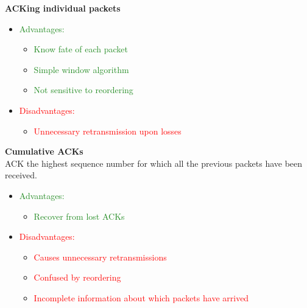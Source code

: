 \documentclass[a4paper, fontsize=8pt, landscape, DIV=1]{scrartcl}
\begin{document}
\begin{multicols*}{4}
		\textbf{ACKing individual packets}
		\vspace{-0.2cm}
		\begin{itemize}[noitemsep]
			\item \textcolor{ForestGreen}{Advantages:}
			\begin{itemize}
				\item \textcolor{ForestGreen}{Know fate of each packet} 
				\item \textcolor{ForestGreen}{Simple window algorithm}
				\item \textcolor{ForestGreen}{Not sensitive to reordering}
			\end{itemize}
			\item \textcolor{red}{Disadvantages:}
			\begin{itemize}
				\item \textcolor{red}{Unnecessary retransmission upon losses}
			\end{itemize} 
		\end{itemize}
		
		\textbf{Cumulative ACKs}\\
		ACK the highest sequence number for which all the previous packets have
		been received.
		\vspace{-0.2cm}
		\begin{itemize}[noitemsep]
			\item \textcolor{ForestGreen}{Advantages:}
			\begin{itemize}
				\item \textcolor{ForestGreen}{Recover from lost ACKs}
			\end{itemize}
			\item \textcolor{red}{Disadvantages:}
			\begin{itemize}
				\item \textcolor{red}{Causes unnecessary retransmissions}
				\item \textcolor{red}{Confused by reordering}
				\item \textcolor{red}{Incomplete information about which packets have
					arrived}
			\end{itemize} 
		\end{itemize}
		

\end{multicols*}
\end{document}
